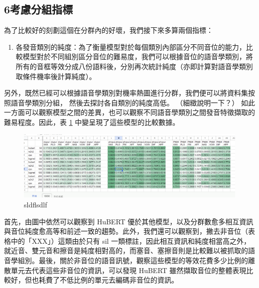 \subsection{6考慮分組指標}


{
}



        為了比較好的刻劃這個在分群內的好壞，我們接下來多算兩個指標：\par
\begin{enumerate}
    \item 各發音類別的純度：為了衡量模型對於每個類別內部區分不同音位的能力，比較模型對於不同組別區分音位的難易度，我們可以根據音位的語音學類別，將所有的音框等效分成八份語料後，分別再次統計純度（亦即計算對語音學類別取條件機率後計算純度）。
\end{enumerate}




        另外，既然已經可以根據語音學類別對機率熱圖進行分群，我們便可以將資料集按照語音學類別分組， 然後去探討各自類別的純度高低。 （細緻說明一下？） 如此一方面可以觀察模型之間的差異，也可以觀察不同語音學類別之間發音特徵擷取的難易程度。因此，表 \ref{sdfsdf} 中變呈現了這些模型的比較數據。

 \begin{figure}
     \centering
     \includegraphics[width=0.5\linewidth]{figures/lll.png}
     \caption{sldflsdlf}
     \label{sdfsdf}
 \end{figure}

        首先，由圖中依然可以觀察到 HuBERT 優於其他模型，以及分群數愈多相互資訊與音位純度愈高等和前述一致的趨勢。此外，我們還可以觀察到，撇去非音位（表格中的「XXX」）這類由於只有 sil 一類標註，因此相互資訊和純度相當高之外，就近音、雙元音和擦音是純度相對高的，而塞音、塞擦音則是比較難以被抓取的語音學組別。最後，關於非音位的語音訊號，觀察這些模型的等效花費多少比例的離散單元去代表這些非音位的資訊，可以發現 HuBERT 雖然擷取音位的整體表現比較好，但也耗費了不低比例的單元去編碼非音位的資訊。


